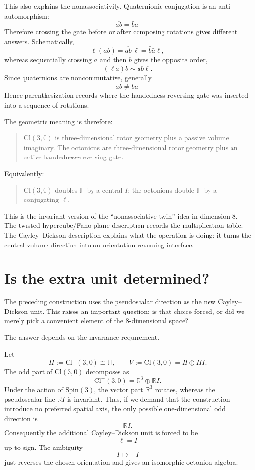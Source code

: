 \documentclass[11pt]{article}
\newcommand{\Cl}{\mathrm{Cl}}
\begin{document}
This also explains the nonassociativity. Quaternionic conjugation is an
anti-automorphism:
\[
\overline{ab}=\bar b\bar a.
\]
Therefore crossing the gate before or after composing rotations gives different
answers. Schematically,
\[
\ell(ab)=\overline{ab}\,\ell=\bar b\bar a\ell,
\]
whereas sequentially crossing $a$ and then $b$ gives the opposite order,
\[
(\ell a)b\sim \bar a\bar b\ell.
\]
Since quaternions are noncommutative, generally
\[
\bar a\bar b\neq \bar b\bar a.
\]
Hence parenthesization records where the handedness-reversing gate was inserted into
a sequence of rotations.

The geometric meaning is therefore:
\begin{quote}
$\Cl(3,0)$ is three-dimensional rotor geometry plus a passive volume imaginary.
The octonions are three-dimensional rotor geometry plus an active
handedness-reversing gate.
\end{quote}

Equivalently:
\begin{quote}
$\Cl(3,0)$ doubles $\mathbb H$ by a central $I$; the octonions double
$\mathbb H$ by a conjugating $\ell$.
\end{quote}

This is the invariant version of the ``nonassociative twin'' idea in dimension
$8$. The twisted-hypercube/Fano-plane description records the multiplication
table. The Cayley--Dickson description explains what the operation is doing:
it turns the central volume direction into an orientation-reversing interface.


\section{Is the extra unit determined?}

The preceding construction uses the pseudoscalar direction as the new
Cayley--Dickson unit. This raises an important question: is that choice forced,
or did we merely pick a convenient element of the $8$-dimensional space?

The answer depends on the invariance requirement.

Let
\[
H:=\Cl^+(3,0)\cong \mathbb H,
\qquad
V:=\Cl(3,0)=H\oplus HI.
\]
The odd part of $\Cl(3,0)$ decomposes as
\[
\Cl^-(3,0)=\mathbb R^3\oplus \mathbb R I.
\]
Under the action of $\mathrm{Spin}(3)$, the vector part $\mathbb R^3$ rotates,
whereas the pseudoscalar line $\mathbb R I$ is invariant. Thus, if we demand
that the construction introduce no preferred spatial axis, the only possible
one-dimensional odd direction is
\[
\mathbb R I.
\]
Consequently the additional Cayley--Dickson unit is forced to be
\[
\ell=I
\]
up to sign. The ambiguity
\[
I\mapsto -I
\]
just reverses the chosen orientation and gives an isomorphic octonion algebra.
\end{document}
